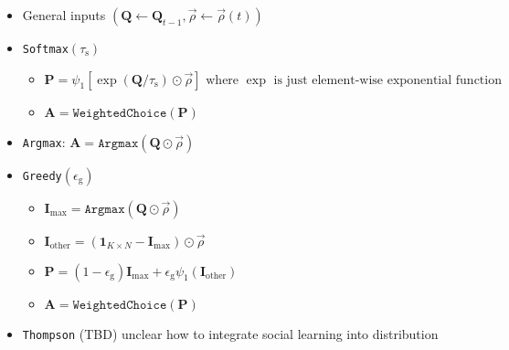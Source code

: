 \documentclass[fleqn]{article}
\newcommand\iidsim{\stackrel{\mathclap{iid}}{\sim}}
\begin{document}
\begin{itemize}
    \item General inputs $\left(
        \mathbf{Q} \leftarrow \mathbf{Q}_{t-1},
        \overrightarrow{\rho} \leftarrow  \overrightarrow{\rho}(t)
        \right)$
    \item \texttt{Softmax}$(\tau_{\mathrm{s}})$
        \begin{itemize}
            \item $\mathbf{P} = \psi_1\left[
                \exp\left(\mathbf{Q}/\tau_{\mathrm{s}}\right)
                \odot
                \overrightarrow{\rho}
                \right]
                \text{ where } \exp
                \text{ is just element-wise exponential function}
                $
            \item $\mathbf{A} = \texttt{WeightedChoice}(\mathbf{P})$
        \end{itemize}
    \item \texttt{Argmax}: $\mathbf{A} = \texttt{Argmax}\left(
        \mathbf{Q} \odot \overrightarrow{\rho}
        \right)$
    \item \texttt{Greedy}$(\epsilon_{\mathrm{g}})$
        \begin{itemize}
            \item $\mathbf{I}_{\mathrm{max}} =
                \texttt{Argmax}(\mathbf{Q}
                \odot
                \overrightarrow{\rho})
                $
            \item $\mathbf{I}_{\mathrm{other}} =
                \left(
                    \mathbf{1}_{K \times N} -
                    \mathbf{I}_{\mathrm{max}}
                \right)
                \odot
                \overrightarrow{\rho}
                $
            \item $\mathbf{P} =
                (1 - \epsilon_{\mathrm{g}}) \mathbf{I}_{\mathrm{max}} +
                \epsilon_{\mathrm{g}}  \psi_1 (\mathbf{I}_{\mathrm{other}})
                $
            \item $\mathbf{A} = \texttt{WeightedChoice}(\mathbf{P})$
        \end{itemize}
    \item \texttt{Thompson} (TBD) unclear how to integrate social learning into distribution
        \begin{itemize}
            \item Generally $
                \mathbf{A} = \texttt{Argmax}\left[
                    \mathbf{X} \iidsim
                    \mathcal{N}\left(
                        \mathbf{\Lambda},

\end{itemize}
\end{itemize}
\end{document}
